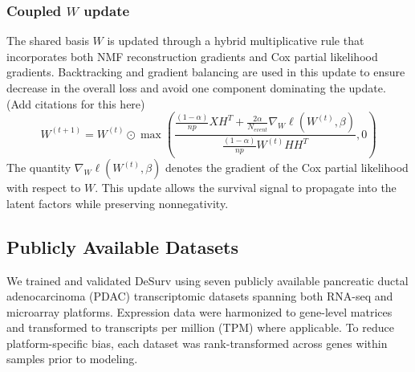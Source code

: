 \documentclass[9pt,twocolumn,twoside,]{pnas-new}
\begin{document}
\subsubsection*{\texorpdfstring{Coupled \(W\)
update}{Coupled W update}}\label{coupled-w-update}

The shared basis \(W\) is updated through a hybrid multiplicative rule
that incorporates both NMF reconstruction gradients and Cox partial
likelihood gradients. Backtracking and gradient balancing are used in
this update to ensure decrease in the overall loss and avoid one
component dominating the update. (Add citations for this here)
\begin{equation}
\label{W_update}
W^{(t+1)} = W^{(t)} \odot \max \left( \frac{\frac{(1-\alpha)}{np}XH^T + \frac{2\alpha}{N_{event}}\nabla_W\ell(W^{(t)}, \beta)}{\frac{(1-\alpha)}{np}W^{(t)}HH^T }, 0 \right)
\end{equation} The quantity \(\nabla_W\ell(W^{(t)}, \beta)\) denotes the
gradient of the Cox partial likelihood with respect to \(W\). This
update allows the survival signal to propagate into the latent factors
while preserving nonnegativity.

\subsection*{Publicly Available
Datasets}\label{publicly-available-datasets}

We trained and validated DeSurv using seven publicly available
pancreatic ductal adenocarcinoma (PDAC) transcriptomic datasets spanning
both RNA-seq and microarray platforms. Expression data were harmonized
to gene-level matrices and transformed to transcripts per million (TPM)
where applicable. To reduce platform-specific bias, each dataset was
rank-transformed across genes within samples prior to modeling.
\end{document}
